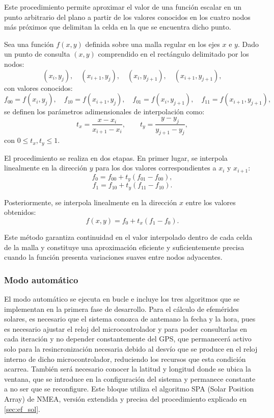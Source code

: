 Este procedimiento permite aproximar el valor de una función escalar en un punto arbitrario del plano a partir de los valores conocidos en los cuatro nodos más próximos que delimitan la celda en la que se encuentra dicho punto.

Sea una función $f(x,y)$ definida sobre una malla regular en los ejes $x$ e $y$. Dado un punto de consulta $(x,y)$ comprendido en el rectángulo delimitado por los nodos:
\[
(x_i, y_j), \quad (x_{i+1}, y_j), \quad (x_i, y_{j+1}), \quad (x_{i+1}, y_{j+1}),
\]
con valores conocidos:
\[
f_{00} = f(x_i, y_j), \quad
f_{10} = f(x_{i+1}, y_j), \quad
f_{01} = f(x_i, y_{j+1}), \quad
f_{11} = f(x_{i+1}, y_{j+1}),
\]
se definen los parámetros adimensionales de interpolación como:
\begin{equation}
	t_x = \frac{x - x_i}{x_{i+1} - x_i}, \qquad
	t_y = \frac{y - y_j}{y_{j+1} - y_j},
\end{equation}
con $0 \leq t_x, t_y \leq 1$.

El procedimiento se realiza en dos etapas. En primer lugar, se interpola linealmente en la dirección $y$ para los dos valores correspondientes a $x_i$ y $x_{i+1}$:
\begin{equation}
	f_0 = f_{00} + t_y (f_{01} - f_{00}),
\end{equation}
\begin{equation}
	f_1 = f_{10} + t_y (f_{11} - f_{10}).
\end{equation}

Posteriormente, se interpola linealmente en la dirección $x$ entre los valores obtenidos:
\begin{equation}
	f(x,y) = f_0 + t_x (f_1 - f_0).
\end{equation}

Este método garantiza continuidad en el valor interpolado dentro de cada celda de la malla y constituye una aproximación eficiente y suficientemente precisa cuando la función presenta variaciones suaves entre nodos adyacentes.

\subsubsection{Modo automático}

El modo automático se ejecuta en bucle e incluye los tres algoritmos que se implementan en la primera fase de desarrollo. Para el cálculo de efemérides solares, es necesario que el sistema conozca de antemano la fecha y la hora, pues es necesario ajustar el reloj del microcontrolador y para poder consultarlas en cada iteración y no depender constantemente del GPS, que permanecerá activo solo para la resincronización necesaria debido al desvío que se produce en el reloj interno de dicho microcontrolador, reduciendo los recursos que esta condición acarrea. También será necesario conocer la latitud y longitud donde se ubica la ventana, que se introduce en la configuración del sistema y permanece constante a no ser que se reconfigure. Este bloque utiliza el algoritmo SPA (Solar Position Array) de NMEA, versión extendida y precisa del procedimiento explicado en \ref{sec:ef_sol}. 

